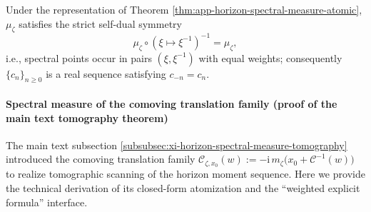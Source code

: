 \begin{corollary}\label{cor:app-horizon-ramanujan-selfdual-measure}
Under the representation of Theorem \ref{thm:app-horizon-spectral-measure-atomic}, \(\mu_{\zeta}\) satisfies the strict self-dual symmetry
\[
\mu_{\zeta}\circ(\xi\mapsto \xi^{-1})^{-1}=\mu_{\zeta},
\]
i.e., spectral points occur in pairs \((\xi,\xi^{-1})\) with equal weights; consequently \(\{c_n\}_{n\ge 0}\) is a real sequence satisfying \(c_{-n}=c_n\).
\end{corollary}

\paragraph{Spectral measure of the comoving translation family (proof of the main text tomography theorem)}\label{par:app-horizon-comoving-spectral-measure}
The main text subsection \ref{subsubsec:xi-horizon-spectral-measure-tomography} introduced the comoving translation family
\(
\mathscr{C}_{\zeta,x_0}(w):=-\mathrm{i}\,m_{\zeta}\!\bigl(x_0+\mathcal{C}^{-1}(w)\bigr)
\)
to realize tomographic scanning of the horizon moment sequence.
Here we provide the technical derivation of its closed-form atomization and the ``weighted explicit formula'' interface.

